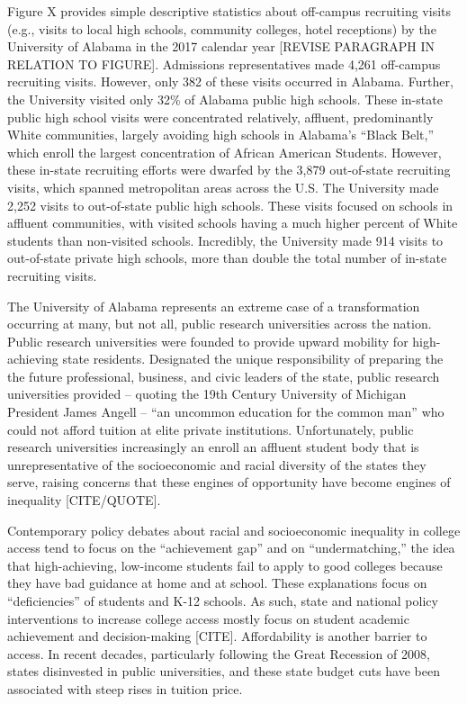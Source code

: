 \documentclass[twoside]{article}
\begin{document}
Figure X provides simple descriptive statistics about off-campus recruiting visits (e.g., visits to local high schools, community colleges, hotel receptions) by the University of Alabama in the 2017 calendar year [REVISE PARAGRAPH IN RELATION TO FIGURE].  Admissions representatives made 4,261 off-campus recruiting visits.  However, only 382 of these visits occurred in Alabama.  Further, the University visited only 32\% of Alabama public high schools. These in-state public high school visits were concentrated relatively, affluent, predominantly White communities, largely avoiding high schools in Alabama's ``Black Belt,'' which enroll the largest concentration of African American Students.  However, these in-state recruiting efforts were dwarfed by the 3,879 out-of-state recruiting visits, which spanned metropolitan areas across the U.S. The University made 2,252 visits to out-of-state public high schools. These visits focused on schools in affluent communities, with visited schools having a much higher percent of White students than non-visited schools.  Incredibly, the University made 914 visits to out-of-state private high schools, more than double the total number of in-state recruiting visits.

The University of Alabama represents an extreme case of a transformation occurring at many, but not all, public research universities across the nation.  Public research universities were founded to provide upward mobility for high-achieving state residents. Designated the unique responsibility of preparing the the future professional, business, and civic leaders of the state, public research universities provided -- quoting the 19th Century University of Michigan President James Angell -- ``an uncommon education for the common man'' who could not afford tuition at elite private institutions.  Unfortunately, public research universities increasingly an enroll an affluent student body that is unrepresentative of the socioeconomic and racial diversity of the states they serve, raising concerns that these engines of opportunity have become engines of inequality [CITE/QUOTE].

Contemporary policy debates about racial and socioeconomic inequality in college access tend to focus on the ``achievement gap'' and on ``undermatching,'' the idea that high-achieving, low-income students fail to apply to good colleges because they have bad guidance at home and at school.  These explanations focus on ``deficiencies'' of students and K-12 schools. As such, state and national policy interventions to increase college access mostly focus on student academic achievement and decision-making [CITE]. Affordability is another barrier to access. In recent decades, particularly following the Great Recession of 2008, states disinvested in public universities, and these state budget cuts have been associated with steep rises in tuition price. 
\end{document}
